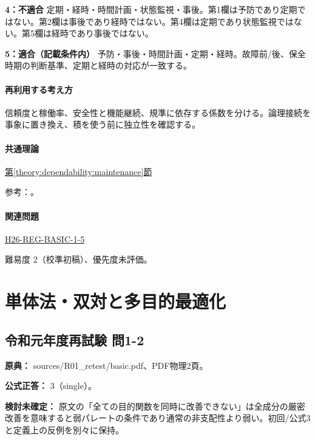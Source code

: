 \noindent\textbf{4：不適合} 定期・経時・時間計画・状態監視・事後。第1欄は予防であり定期ではない。第2欄は事後であり経時ではない。第4欄は定期であり状態監視ではない。第5欄は経時であり事後ではない。\par

\noindent\textbf{5：適合（記載条件内）} 予防・事後・時間計画・定期・経時。故障前/後、保全時期の判断基準、定期と経時の対応が一致する。\par

\paragraph{再利用する考え方} 信頼度と稼働率、安全性と機能継続、規準に依存する係数を分ける。論理接続を事象に置き換え、積を使う前に独立性を確認する。

\paragraph{共通理論} \hyperref[theory:dependability:maintenance]{第\ref*{theory:dependability:maintenance}節}

\par 参考：\cite{maintenance_mlit_2013}。

\paragraph{関連問題} \hyperref[q:h26-reg-basic-1-5]{H26-REG-BASIC-1-5}

\par 難易度 2（校準初稿）、優先度未評価。

\section{単体法・双対と多目的最適化}

\subsection{令和元年度再試験 問1-2}
\label{q:r01-ret-basic-1-2}

\noindent\textbf{原典：} sources/R01\_retest/basic.pdf、PDF物理2頁。

\textbf{公式正答：} 3（single）。

\par\textbf{検討未確定：} 原文の「全ての目的関数を同時に改善できない」は全成分の厳密改善を意味すると弱パレートの条件であり通常の非支配性より弱い。初回/公式3と定義上の反例を別々に保持。

